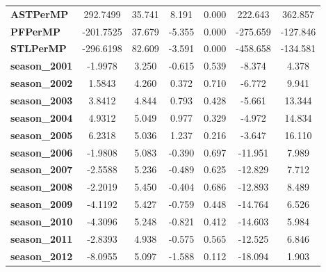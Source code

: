 \begin{center}
\begin{tabular}{lcccccc}
\textbf{ASTPerMP}             &     292.7499  &       35.741     &     8.191  &         0.000        &      222.643    &      362.857     \\
\textbf{PFPerMP}              &    -201.7525  &       37.679     &    -5.355  &         0.000        &     -275.659    &     -127.846     \\
\textbf{STLPerMP}             &    -296.6198  &       82.609     &    -3.591  &         0.000        &     -458.658    &     -134.581     \\
\textbf{season\_2001}         &      -1.9978  &        3.250     &    -0.615  &         0.539        &       -8.374    &        4.378     \\
\textbf{season\_2002}         &       1.5843  &        4.260     &     0.372  &         0.710        &       -6.772    &        9.941     \\
\textbf{season\_2003}         &       3.8412  &        4.844     &     0.793  &         0.428        &       -5.661    &       13.344     \\
\textbf{season\_2004}         &       4.9312  &        5.049     &     0.977  &         0.329        &       -4.972    &       14.834     \\
\textbf{season\_2005}         &       6.2318  &        5.036     &     1.237  &         0.216        &       -3.647    &       16.110     \\
\textbf{season\_2006}         &      -1.9808  &        5.083     &    -0.390  &         0.697        &      -11.951    &        7.989     \\
\textbf{season\_2007}         &      -2.5588  &        5.236     &    -0.489  &         0.625        &      -12.829    &        7.712     \\
\textbf{season\_2008}         &      -2.2019  &        5.450     &    -0.404  &         0.686        &      -12.893    &        8.489     \\
\textbf{season\_2009}         &      -4.1192  &        5.427     &    -0.759  &         0.448        &      -14.764    &        6.526     \\
\textbf{season\_2010}         &      -4.3096  &        5.248     &    -0.821  &         0.412        &      -14.603    &        5.984     \\
\textbf{season\_2011}         &      -2.8393  &        4.938     &    -0.575  &         0.565        &      -12.525    &        6.846     \\
\textbf{season\_2012}         &      -8.0955  &        5.097     &    -1.588  &         0.112        &      -18.094    &        1.903     \\

\end{tabular}
\end{center}
